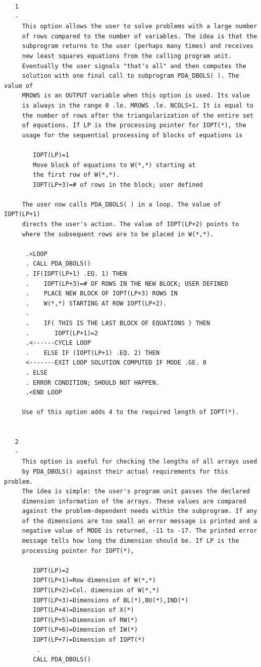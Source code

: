 \documentclass[11pt,twoside]{article}
\begin{document}
\begin{verbatim}
   1
   -
     This option allows the user to solve problems with a large number
     of rows compared to the number of variables. The idea is that the
     subprogram returns to the user (perhaps many times) and receives
     new least squares equations from the calling program unit.
     Eventually the user signals "that's all" and then computes the
     solution with one final call to subprogram PDA_DBOLS( ). The value of
     MROWS is an OUTPUT variable when this option is used. Its value
     is always in the range 0 .le. MROWS .le. NCOLS+1. It is equal to
     the number of rows after the triangularization of the entire set
     of equations. If LP is the processing pointer for IOPT(*), the
     usage for the sequential processing of blocks of equations is

        IOPT(LP)=1
        Move block of equations to W(*,*) starting at
        the first row of W(*,*).
        IOPT(LP+3)=# of rows in the block; user defined

     The user now calls PDA_DBOLS( ) in a loop. The value of IOPT(LP+1)
     directs the user's action. The value of IOPT(LP+2) points to
     where the subsequent rows are to be placed in W(*,*).

      .<LOOP
      . CALL PDA_DBOLS()
      . IF(IOPT(LP+1) .EQ. 1) THEN
      .    IOPT(LP+3)=# OF ROWS IN THE NEW BLOCK; USER DEFINED
      .    PLACE NEW BLOCK OF IOPT(LP+3) ROWS IN
      .    W(*,*) STARTING AT ROW IOPT(LP+2).
      .
      .    IF( THIS IS THE LAST BLOCK OF EQUATIONS ) THEN
      .       IOPT(LP+1)=2
      .<------CYCLE LOOP
      .    ELSE IF (IOPT(LP+1) .EQ. 2) THEN
      <-------EXIT LOOP SOLUTION COMPUTED IF MODE .GE. 0
      . ELSE
      . ERROR CONDITION; SHOULD NOT HAPPEN.
      .<END LOOP

     Use of this option adds 4 to the required length of IOPT(*).


   2
   -
     This option is useful for checking the lengths of all arrays used
     by PDA_DBOLS() against their actual requirements for this problem.
     The idea is simple: the user's program unit passes the declared
     dimension information of the arrays. These values are compared
     against the problem-dependent needs within the subprogram. If any
     of the dimensions are too small an error message is printed and a
     negative value of MODE is returned, -11 to -17. The printed error
     message tells how long the dimension should be. If LP is the
     processing pointer for IOPT(*),

        IOPT(LP)=2
        IOPT(LP+1)=Row dimension of W(*,*)
        IOPT(LP+2)=Col. dimension of W(*,*)
        IOPT(LP+3)=Dimensions of BL(*),BU(*),IND(*)
        IOPT(LP+4)=Dimension of X(*)
        IOPT(LP+5)=Dimension of RW(*)
        IOPT(LP+6)=Dimension of IW(*)
        IOPT(LP+7)=Dimension of IOPT(*)
         .
        CALL PDA_DBOLS()


\end{verbatim}
\end{document}
